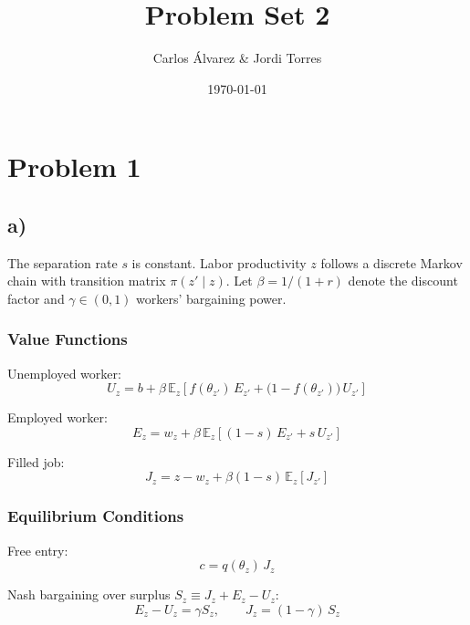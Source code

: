 \documentclass[12pt]{article}
\title{Problem Set 2}
\author{Carlos Álvarez \& Jordi Torres}
\date{\today}
\begin{document}
\maketitle
\setlength{\parindent}{0em}
\section*{Problem 1}
\subsection*{a)}

The separation rate $s$ is constant. Labor productivity $z$ follows a discrete
Markov chain with transition matrix $\pi(z' \mid z)$. Let $\beta = 1/(1+r)$
denote the discount factor and $\gamma \in (0,1)$ workers' bargaining power.

\subsubsection*{Value Functions}

Unemployed worker:
\begin{equation}
    U_z = b + \beta\,\mathbb{E}_z\!\left[
        f(\theta_{z'})\,E_{z'} + \bigl(1 - f(\theta_{z'})\bigr)\,U_{z'}
    \right]
\end{equation}

Employed worker:
\begin{equation}
    E_z = w_z + \beta\,\mathbb{E}_z\!\left[
        (1-s)\,E_{z'} + s\,U_{z'}
    \right]
\end{equation}

Filled job:
\begin{equation}
    J_z = z - w_z + \beta(1-s)\,\mathbb{E}_z\!\left[J_{z'}\right]
\end{equation}

\subsubsection*{Equilibrium Conditions}

Free entry:
\begin{equation}\label{eq:FE}
    c = q(\theta_z)\,J_z \tag{FE}
\end{equation}

Nash bargaining over surplus $S_z \equiv J_z + E_z - U_z$:
\begin{equation}\label{eq:NB}
    E_z - U_z = \gamma S_z, \qquad J_z = (1-\gamma)\,S_z \tag{NB}
\end{equation}
\end{document}

